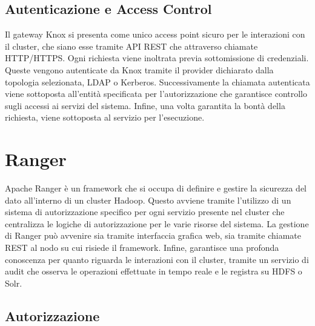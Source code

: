 \subsection{Autenticazione e Access Control}
Il gateway Knox si presenta come unico access point sicuro per le interazioni con il cluster, che siano esse tramite API REST che attraverso chiamate HTTP/HTTPS. Ogni richiesta viene inoltrata previa sottomissione di credenziali. Queste vengono autenticate da Knox tramite il provider dichiarato dalla topologia selezionata, LDAP o Kerberos.
Successivamente la chiamata autenticata viene sottoposta all'entità specificata per l'autorizzazione che garantisce controllo sugli accessi ai servizi del sistema.
Infine, una volta garantita la bontà della richiesta, viene sottoposta al servizio per l'esecuzione.

\pagebreak

\section{Ranger}

Apache Ranger \cite{ranger_doc} è un framework che si occupa di definire e gestire la sicurezza del dato all'interno di un cluster Hadoop. Questo avviene tramite l'utilizzo di un sistema di autorizzazione specifico per ogni servizio presente nel cluster che centralizza le logiche di autorizzazione per le varie risorse del sistema. La gestione di Ranger può avvenire sia tramite interfaccia grafica web, sia tramite chiamate REST al nodo su cui risiede il framework. Infine, garantisce una profonda conoscenza per quanto riguarda le interazioni con il cluster, tramite un servizio di audit che osserva le operazioni effettuate in tempo reale e le registra su HDFS o Solr.

\subsection{Autorizzazione}

